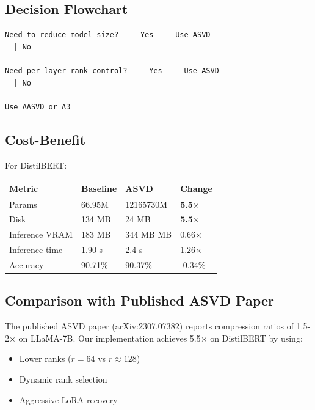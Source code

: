 \subsection{Decision Flowchart}

\begin{lstlisting}
Need to reduce model size? --- Yes --- Use ASVD
  | No
   
Need per-layer rank control? --- Yes --- Use ASVD
  | No
   
Use AASVD or A3
\end{lstlisting}

\subsection{Cost-Benefit}

For DistilBERT:

\begin{table}[H]
\centering
\small
\begin{tabular}{llll}
\toprule
\textbf{Metric} & \textbf{Baseline} & \textbf{ASVD} & \textbf{Change} \\
\midrule
Params & 66.95M & 12165730M & \textbf{5.5$\times$} \\
Disk & 134 MB & 24 MB & \textbf{5.5$\times$} \\
Inference VRAM & 183 MB & 344 MB MB & 0.66$\times$ \\
Inference time & 1.90 s & 2.4 s & 1.26$\times$ \\
Accuracy & 90.71\% & 90.37\% & -0.34\% \\
\bottomrule
\end{tabular}
\end{table}

\subsection{Comparison with Published ASVD Paper}

The published ASVD paper (arXiv:2307.07382) reports compression ratios of 
1.5-2$\times$ on LLaMA-7B. Our implementation achieves 5.5$\times$ on DistilBERT 
by using:

\begin{itemize}
\item Lower ranks ($r = 64$ vs $r \approx 128$)
\item Dynamic rank selection
\item Aggressive LoRA recovery

\end{itemize}
